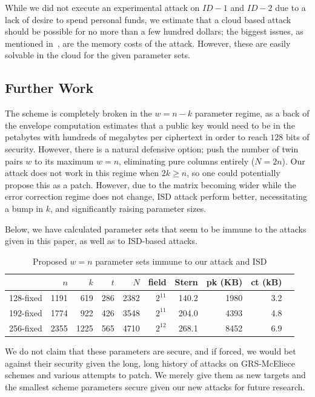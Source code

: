 While we did not execute an experimental attack on $ID-1$ and $ID-2$ due to a
lack of desire to spend personal funds, we estimate that a cloud based attack should be possible
for no more than a few hundred dollars; the biggest issues, as mentioned
in~\cite{GIJS26}, are the memory costs of the attack. However, these are easily
solvable in the cloud for the given parameter sets.

\subsection{Further Work}\label{sec:further-work}
The scheme is completely broken in the $w=n-k$ parameter regime, as a back of the envelope 
computation estimates that a public key would need to be in the petabytes with hundreds of megabytes per 
ciphertext in order to reach $128$ bits of security. However, there is a natural
defensive option; push the number of twin pairs $w$ to its maximum
$w=n$, eliminating pure columns entirely ($N=2n$). Our attack does not work in
this regime when $2k \geq n$, so one could potentially propose this as a patch.
However, due to the matrix becoming wider while the error correction regime
does not change, ISD attack perform better, necessitating a bump in $k$, and
significantly raising parameter sizes.

Below, we have calculated parameter sets that seem to be immune to the attacks
given in this paper, as well as to ISD-based attacks. 

\begin{table}[!ht]
      \caption{Proposed $w=n$ parameter sets immune to our attack and ISD}
      \begin{tabular}{lrrrrrrrrr}
            \toprule
                      & $n$  & $k$  & $t$ & $N$  & field    & Stern & pk (KB)   & ct (kB)\\
            \midrule
            128-fixed & 1191 & 619  & 286 & 2382 & $2^{11}$ & 140.2 & 1980    & 3.2 \\
            192-fixed & 1774 & 922  & 426 & 3548 & $2^{11}$ & 204.0 & 4393    & 4.8 \\
            256-fixed & 2355 & 1225 & 565 & 4710 & $2^{12}$ & 268.1 & 8452    & 6.9 \\
            \bottomrule
      \end{tabular}
\end{table}

We do not claim that these parameters are secure, and if forced, we would bet
against their security given the long, long history of attacks on GRS-McEliece
schemes and various attempts to patch. We merely give them as new targets and
the smallest scheme parameters secure given our new attacks for future research. 